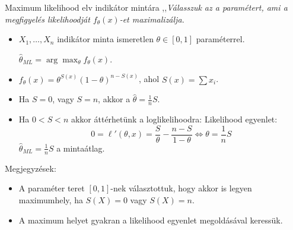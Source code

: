 \documentclass[aspectratio=169,notheorems,9pt,\option]{beamer}
\begin{document}
  \begin{frame}{Maximum likelihood elv indikátor mintára}
    ,,\textit{Válasszuk az a paramétert, ami a megfigyelés likelihoodját $f_\theta(x)$-et maximalizálja.}
    \begin{itemize}
      \item $X_1,\dots,X_n$ indikátor minta ismeretlen $\theta\in[0,1]$ paraméterrel. 
      
      $\hat{\theta}_{ML}=\arg\max_\theta f_{\theta}(x)$.
      
      \item $f_\theta(x)=\theta^{S(x)}(1-\theta)^{n-S(x)}$, ahol $S(x)=\sum x_i$. 
      \item Ha $S=0$, vagy $S=n$, akkor a $\hat{\theta}=\frac1n S$.
      \item Ha $0<S<n$ akkor áttérhetünk a loglikelihoodra:
      Likelihood egyenlet:
      \begin{displaymath}
        0=\ell'(\theta,x)=\frac{S}{\theta}-\frac{n-S}{1-\theta}\iff \theta=\frac{1}n S
      \end{displaymath}
      $\hat\theta_{ML}=\frac1n S$ a mintaátlag.
    \end{itemize}
    \continue
    Megjegyzések:
    \begin{itemize}
      \item A paraméter teret $[0,1]$-nek választottuk, hogy akkor is legyen maximumhely, ha $S(X)=0$ vagy $S(X)=n$.
      \item A maximum helyet gyakran a likelihood egyenlet megoldásával keressük.
    \end{itemize}
\end{frame}
\end{document}
